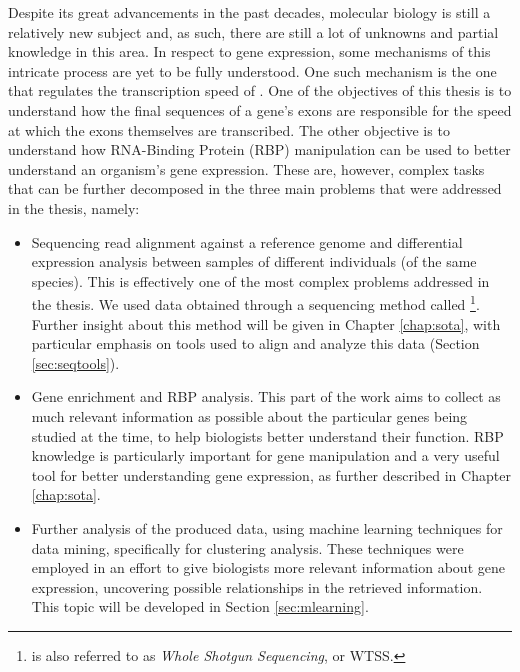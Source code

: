 Despite its great advancements in the past decades, molecular biology is still a
relatively new subject and, as such, there are still a lot of unknowns and
partial knowledge in this area. In respect to gene expression, some mechanisms
of this intricate process are yet to be fully understood. One such mechanism is
the one that regulates the transcription speed of \rna. One of the objectives of
this thesis is to understand how the final sequences of a gene's exons are
responsible for the speed at which the exons themselves are transcribed. The
other objective is to understand how RNA-Binding Protein (RBP) manipulation can
be used to better understand an organism's gene expression. These are, however,
complex tasks that can be further decomposed in the three main problems that
were addressed in the thesis, namely:

\begin{itemize}

  \item
  Sequencing read alignment against a reference genome and differential
  expression analysis between samples of different individuals (of the same
  species). This is effectively one of the most complex problems addressed in
  the thesis. We used data obtained through a sequencing method called
  \rnaseq{}\footnote{\rnaseq{} is also referred to as \textit{Whole \Trans{}
  Shotgun Sequencing}, or WTSS.}. Further insight about this method will be
  given in Chapter \ref{chap:sota}, with particular emphasis on tools used to
  align and analyze this data (Section \ref{sec:seqtools}).

  \item
  Gene enrichment and RBP analysis. This part of the work aims to collect as
  much relevant information as possible about the particular genes being studied
  at the time, to help biologists better understand their function. RBP
  knowledge is particularly important for gene manipulation and a very useful
  tool for better understanding gene expression, as further described in Chapter
  \ref{chap:sota}.

  \item
  Further analysis of the produced data, using machine learning techniques for
  data mining, specifically for clustering analysis. These techniques were
  employed in an effort to give biologists more relevant information about gene
  expression, uncovering possible relationships in the retrieved information.
  This topic will be developed in Section \ref{sec:mlearning}.

\end{itemize}


